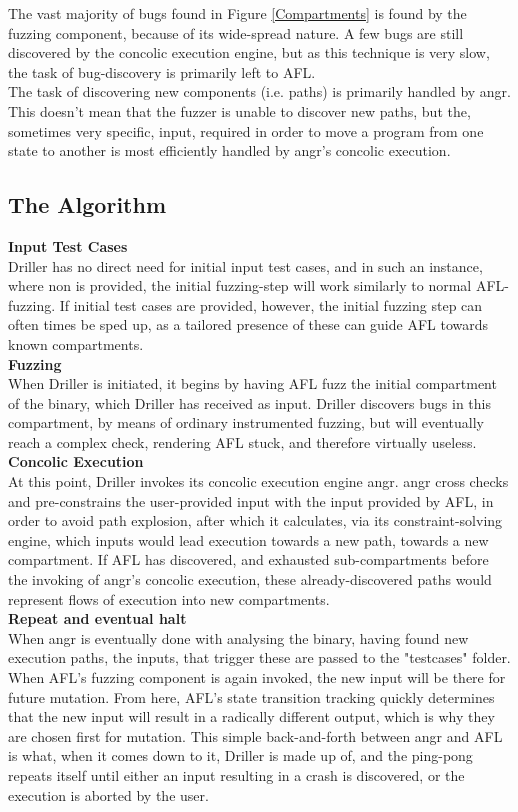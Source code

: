 \documentclass[a4paper]{article}
\newcommand{\tbf}[1]{\textbf{#1}}
\newcommand{\subsubsubsection}[1]{\tbf{#1}\\}
\begin{document}
The vast majority of bugs found in Figure \ref{Compartments} is found by the fuzzing component, because of its wide-spread nature. A few bugs are still discovered by the concolic execution engine, but as this technique is very slow, the task of bug-discovery is primarily left to AFL.\\[0.1cm]
The task of discovering new components (i.e. paths) is primarily handled by angr. This doesn't mean that the fuzzer is unable to discover new paths, but the, sometimes very specific, input, required in order to move a program from one state to another is most efficiently handled by angr's concolic execution.
\subsection{The Algorithm}
\subsubsubsection{Input Test Cases}
Driller has no direct need for initial input test cases, and in such an instance, where non is provided, the initial fuzzing-step will work similarly to normal AFL-fuzzing. If initial test cases are provided, however, the initial fuzzing step can often times be sped up, as a tailored presence of these can guide AFL towards known compartments.\\
\subsubsubsection{Fuzzing}
When Driller is initiated, it begins by having AFL fuzz the initial compartment of the binary, which Driller has received as input. Driller discovers bugs in this compartment, by means of ordinary instrumented fuzzing, but will eventually reach a complex check, rendering AFL stuck, and therefore virtually useless.\\
\subsubsubsection{Concolic Execution}
At this point, Driller invokes its concolic execution engine angr. angr cross checks and pre-constrains the user-provided input with the input provided by AFL, in order to avoid path explosion, after which it calculates, via its constraint-solving engine, which inputs would lead execution towards a new path, towards a new compartment. If AFL has discovered, and exhausted sub-compartments before the invoking of angr's concolic execution, these already-discovered paths would represent flows of execution into new compartments.\\
\subsubsubsection{Repeat and eventual halt}
When angr is eventually done with analysing the binary, having found new execution paths, the inputs, that trigger these are passed to the "testcases" folder. When AFL's fuzzing component is again invoked, the new input will be there for future mutation. From here, AFL's state transition tracking quickly determines that the new input will result in a radically different output, which is why they are chosen first for mutation. This simple back-and-forth between angr and AFL is what, when it comes down to it, Driller is made up of, and the ping-pong repeats itself until either an input resulting in a crash is discovered, or the execution is aborted by the user. 
\end{document}
